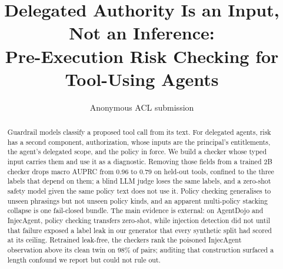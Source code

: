 \documentclass[11pt]{article}
\title{Delegated Authority Is an Input, Not an Inference: \\ Pre-Execution Risk Checking for Tool-Using Agents}
\author{Anonymous ACL submission}
\begin{document}
\maketitle

\begin{abstract}
Guardrail models classify a proposed tool call from its text. For delegated
agents, risk has a second component, authorization, whose inputs are the
principal's entitlements, the agent's delegated scope, and the policy in
force. We build a checker whose typed input carries them and use it as a
diagnostic. Removing those fields from a trained 2B checker drops macro
AUPRC from 0.96 to 0.79 on held-out tools, confined to the three labels
that depend on them; a blind LLM judge loses the same labels, and a
zero-shot safety model given the same policy text does not use it. Policy
checking generalises to unseen phrasings but not unseen policy kinds, and
an apparent multi-policy stacking collapse is one fail-closed bundle. The
main evidence is external: on AgentDojo and InjecAgent, policy checking
transfers zero-shot, while injection detection did not until that failure
exposed a label leak in our generator that every synthetic split had scored
at its ceiling. Retrained leak-free, the checkers rank the poisoned
InjecAgent observation above its clean twin on 98\% of pairs; auditing that
construction surfaced a length confound we report but could not rule out.
\end{abstract}















\appendix

\end{document}
